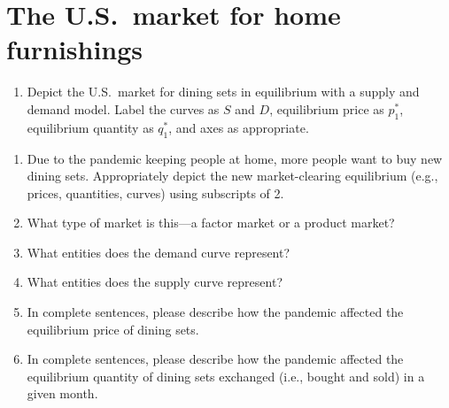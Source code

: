 \documentclass[
    letterpaper,paper=portrait,fleqn,
    DIV=16,fontsize=12pt,twoside=semi,
    parskip=full-,
    headings=standardclasses]
{scrartcl}
\begin{document}
\clearpage

\section{The U.S.~market for home furnishings}

\begin{enumerate}

\item Depict the U.S.~market for dining sets in equilibrium with a supply and demand model. Label the curves as $S$ and $D$, equilibrium price as $p^*_1$, equilibrium quantity as $q^*_1$, and axes as appropriate.

\end{enumerate}

\begin{center}
\vspace{18pt}
\end{center}

\begin{enumerate}[resume]

\item Due to the pandemic keeping people at home, more people want to buy new dining sets. Appropriately depict the new market-clearing equilibrium (e.g., prices, quantities, curves) using subscripts of 2.

\item What type of market is this---a factor market or a product market?

\vfill

\vspace{-2\baselineskip}

\clearpage

\item What entities does the demand curve represent?

\vfill

\item What entities does the supply curve represent?

\vfill

\item In complete sentences, please describe how the pandemic affected the equilibrium price of dining sets.

\vfill

\item In complete sentences, please describe how the pandemic affected the equilibrium quantity of dining sets exchanged (i.e., bought and sold) in a given month.

\vfill

\vspace{-2\baselineskip}

\end{enumerate}
\end{document}
